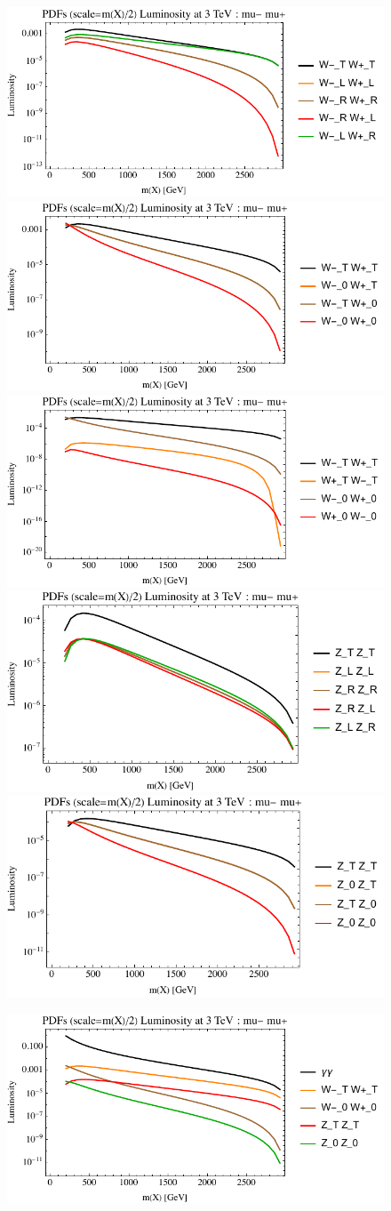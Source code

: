 \documentclass[a4paper,11pt]{article}
\begin{document}
\begin{figure}[ht]
\includegraphics[width=0.46\linewidth]{PlotLumi/3TeV/lumis/plotWWpolRandL.pdf}
\includegraphics[width=0.46\linewidth]{PlotLumi/3TeV/lumis/plotWWpolTand0.pdf}
\includegraphics[width=0.46\linewidth]{PlotLumi/3TeV/lumis/plotWmWpandWpWm.pdf}
\includegraphics[width=0.46\linewidth]{PlotLumi/3TeV/lumis/plotZZpolRandL.pdf}
\includegraphics[width=0.46\linewidth]{PlotLumi/3TeV/lumis/plotZZpolTand0.pdf}
\end{figure}

\begin{figure}
\includegraphics[width=0.46\linewidth]{PlotLumi/3TeV/lumis/plotgammaWZ.pdf}
\end{figure}
\end{document}
